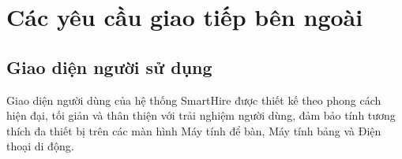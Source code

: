 
\clearpage

\section{Các yêu cầu giao tiếp bên ngoài}

\subsection{Giao diện người sử dụng}

Giao diện người dùng của hệ thống SmartHire được thiết kế theo phong cách hiện đại, tối giản và thân thiện với trải nghiệm người dùng, đảm bảo tính tương thích đa thiết bị trên các màn hình Máy tính để bàn, Máy tính bảng và Điện thoại di động.

